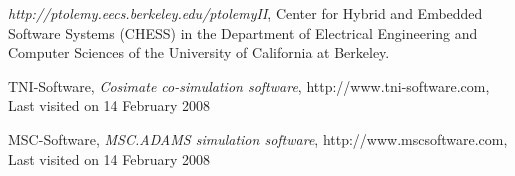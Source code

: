 \begin{thebibliography}{14}

 {\em http://ptolemy.eecs.berkeley.edu/ptolemyII},
	Center for Hybrid and Embedded Software Systems (CHESS) in the
	Department of Electrical Engineering and Computer Sciences of
	the University of California at Berkeley.









 TNI-Software,
	{\em Cosimate co-simulation software},
	http://www.tni-software.com,
	Last visited on 14 February 2008



 MSC-Software,
	{\em MSC.ADAMS simulation software},
	http://www.mscsoftware.com, 
	Last visited on 14 February 2008

\end{thebibliography}
